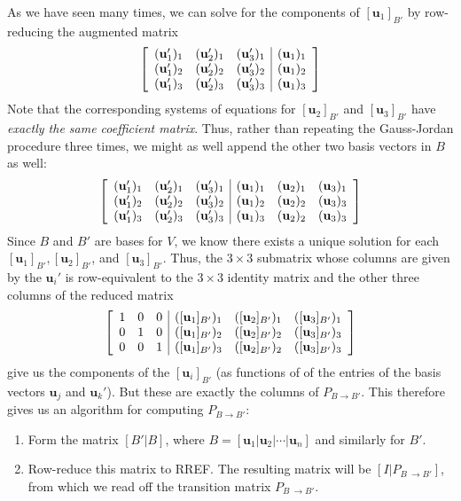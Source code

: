 \documentclass[12pt,letterpaper,reqno]{article}
\numberwithin{equation}{section}
\newcommand{\bu}{\mathbf{u}}
\begin{document}
As we have seen many times, we can solve for the components of $[\bu_1]_{B'}$ by row-reducing the augmented matrix
\begin{align*}
	\left[\begin{array}{c c c | c}
		(\bu_1')_1 & (\bu_2')_1 & (\bu_3')_1 & (\bu_1)_1  \\
		(\bu_1')_2 & (\bu_2')_2 & (\bu_3')_2 & (\bu_1)_2\\
		(\bu_1')_3 & (\bu_2')_3 & (\bu_3')_3 & (\bu_1)_3 \\
	\end{array}\right]
\end{align*}
Note that the corresponding systems of equations for $[\bu_2]_{B'}$ and $[\bu_3]_{B'}$ have \emph{exactly the same coefficient matrix}. Thus, rather than repeating the Gauss-Jordan procedure three times, we might as well append the other two basis vectors in $B$ as well:
\begin{align*}
	\left[\begin{array}{c c c | c c c}
		(\bu_1')_1 & (\bu_2')_1 & (\bu_3')_1 & (\bu_1)_1 & (\bu_2)_1 & (\bu_3)_1   \\
		(\bu_1')_2 & (\bu_2')_2 & (\bu_3')_2 & (\bu_1)_2 & (\bu_2)_2 & (\bu_3)_3\\
		(\bu_1')_3 & (\bu_2')_3 & (\bu_3')_3 & (\bu_1)_3 & (\bu_2)_2 & (\bu_3)_3 \\
	\end{array}\right]
\end{align*}
Since $B$ and $B'$ are bases for $V$, we know there exists a unique solution for each $[\bu_1]_{B'}, [\bu_2]_{B'}$,  and $[\bu_3]_{B'}$. Thus, the $3 \times 3$ submatrix whose columns are given by the $\bu_i'$ is row-equivalent to the $3 \times 3$ identity matrix and the other three columns of the reduced matrix
\begin{align*}
	\left[\begin{array}{c c c | c c c}
		1 & 0 & 0 & ([\bu_1]_{B'})_1 & ([\bu_2]_{B'})_1 & ([\bu_3]_{B'})_1   \\
		0 & 1 & 0 & ([\bu_1]_{B'})_2 & ([\bu_2]_{B'})_2 & ([\bu_3]_{B'})_3\\
		0 & 0 & 1 & ([\bu_1]_{B'})_3 & ([\bu_2]_{B'})_2 & ([\bu_3]_{B'})_3  \\
	\end{array}\right]
\end{align*}
give us the components of the $[\bu_i]_{B'}$ (as functions of of the entries of the basis vectors $\bu_j$ and $\bu_k'$). But these are exactly the columns of $P_{B \to B'}$. This therefore gives us an algorithm for computing $P_{B \to B'}$:
\begin{enumerate}
	\item Form the matrix $\left[B'|B\right]$, where $B=\left[\bu_1|\bu_2|\cdots|\bu_n\right]$ and similarly for $B'$.
	\item Row-reduce this matrix to RREF. The resulting matrix will be $\left[I|P_{B\ \to B'}\right]$, from which we read off the transition matrix $P_{B\ \to B'}$.
\end{enumerate}
\end{document}

